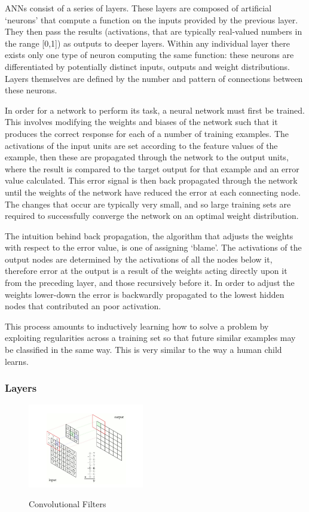 \documentclass[a4paper,11pt,titlepage]{article}
\begin{document}
		ANNs consist of a series of layers. These layers are composed of artificial `neurons' that compute a function on the inputs provided by the previous layer. They then pass the results (activations, that are typically real-valued numbers in the range [0,1]) as outputs to deeper layers. Within any individual layer there exists only one type of neuron computing the same function: these neurons are differentiated by potentially distinct inputs, outputs and weight distributions. Layers themselves are defined by the number and pattern of connections between these neurons. 
		\par 
		In order for a network to perform its task, a neural network must first be trained. This involves modifying the weights and biases of the network such that it produces the correct response for each of a number of training examples. The activations of the input units are set according to the feature values of the example, then these are propagated through the network to the output units, where the result is compared to the target output for that example and an error value calculated. This error signal is then back propagated through the network until the weights of the network have reduced the error at each connecting node. The changes that occur are typically very small, and so large training sets are required to successfully converge the network on an optimal weight distribution.
		\par 
		The intuition behind back propagation, the algorithm that adjusts the weights with respect to the error value, is one of assigning `blame'. The activations of the output nodes are determined by the activations of all the nodes below it, therefore error at the output is a result of the weights acting directly upon it from the preceding layer, and those recursively before it. In order to adjust the weights lower-down the error is backwardly propagated to the lowest hidden nodes that contributed an poor activation.		
		\par
		This process amounts to inductively learning how to solve a problem by exploiting regularities across a training set so that future similar examples may be classified in the same way. This is very similar to the way a human child learns.

	\subsubsection{Layers}

		\begin{figure}[H]
    			\centering	
    			{{\includegraphics[width=0.45\textwidth]
    				{img/convolutional_network.png} 
    			}}%
    			\caption{Convolutional Filters}%
    			\label{fig:convfilters}
		\end{figure}		
\end{document}
